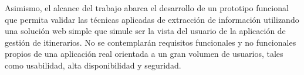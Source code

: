 Asimismo, el alcance del trabajo abarca el desarrollo de un prototipo funcional que permita validar las técnicas
aplicadas de extracción de información utilizando una solución web simple que simule ser la vista del usuario de la
aplicación de gestión de itinerarios.
No se contemplarán requisitos funcionales y no funcionales propios de una aplicación real orientada a un gran volumen
de usuarios, tales como usabilidad, alta disponibilidad y seguridad.